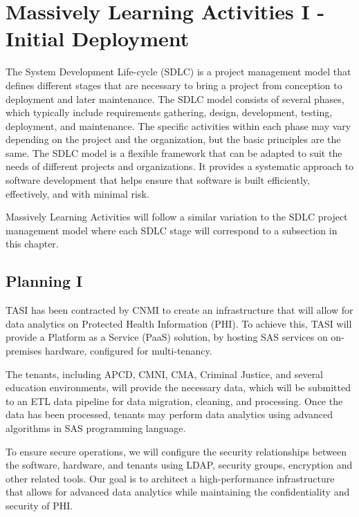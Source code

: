 \section{Massively Learning Activities I - Initial Deployment} \label{section: MLA}
The System Development Life-cycle (SDLC) is a project management model that defines different stages that are necessary to bring a project from conception to deployment and later maintenance. The SDLC model consists of several phases, which typically include requirements gathering, design, development, testing, deployment, and maintenance. The specific activities within each phase may vary depending on the project and the organization, but the basic principles are the same. The SDLC model is a flexible framework that can be adapted to suit the needs of different projects and organizations. It provides a systematic approach to software development that helps ensure that software is built efficiently, effectively, and with minimal risk.

Massively Learning Activities will follow a similar variation to the SDLC project management model where each SDLC stage will correspond to a subsection in this chapter.


\subsection{Planning I} 

TASI has been contracted by CNMI to create an infrastructure that will allow for data analytics on Protected Health Information (PHI). To achieve this, TASI will provide a Platform as a Service (PaaS) solution, by hosting SAS services on on-premises hardware, configured for multi-tenancy.

The tenants, including APCD, CMNI, CMA, Criminal Justice, and several education environments, will provide the necessary data, which will be submitted to an ETL data pipeline for data migration, cleaning, and processing. Once the data has been processed, tenants may perform data analytics using advanced algorithms in SAS programming language.

To ensure secure operations, we will configure the security relationships between the software, hardware, and tenants using LDAP, security groups, encryption  and other related tools. Our goal is to architect a high-performance infrastructure that allows for advanced data analytics while maintaining the confidentiality and security of PHI.

